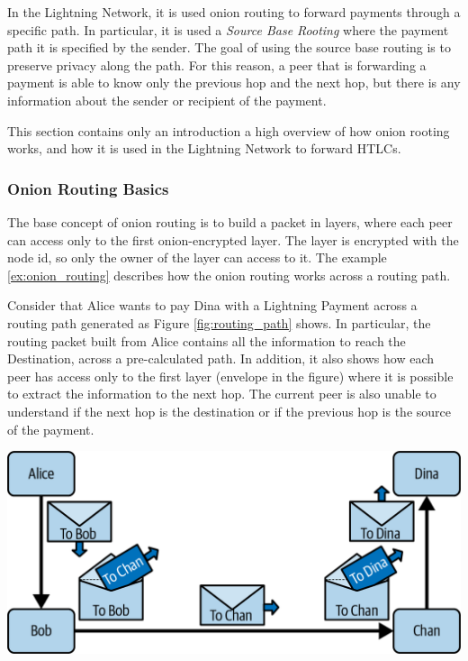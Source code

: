 In the Lightning Network, it is used onion routing to forward payments through a specific path.
In particular, it is used a \emph{Source Base Rooting} where the payment path it is specified by the sender.
The goal of using the source base routing is to preserve privacy along the path. For this reason, a peer that
is forwarding a payment is able to know only the previous hop and the next hop, but there is any information
about the sender or recipient of the payment.

This section contains only an introduction a high overview of how onion rooting works,
and how it is used in the Lightning Network to forward HTLCs.

\subsubsection{Onion Routing Basics}

The base concept of onion routing is to build a packet in layers, where each peer can access only to the
first onion-encrypted layer. The layer is encrypted with the node id, so only the owner of the layer can access to it.
The example \ref{ex:onion_routing} describes how the onion routing works across a routing path.

\begin{example}
  \label{ex:onion_routing}
  Consider that Alice wants to pay Dina with a Lightning Payment across a routing path generated as Figure \ref{fig:routing_path} shows.
  In particular, the routing packet built from Alice contains all the
  information to reach the Destination, across a pre-calculated path.
  In addition, it also shows how each peer has access only to the first layer (envelope in the figure) where it is possible to extract the information to the next hop.
  The current peer is also unable to understand if the next hop is the destination or if the previous hop is the source of the payment.

  {\centering
    \includegraphics[width=0.6\columnwidth]{imgs/mtln_1007.png}
    \par}
\end{example}

